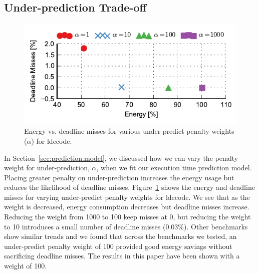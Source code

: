 \subsection{Under-prediction Trade-off}

\begin{figure}
  \begin{center}
    \includegraphics{exec_time_prediction/data/underpredict_sweep.pdf}
    \caption{Energy vs. deadline misses for various under-predict penalty
    weights ($\alpha$) for ldecode.}
    \label{fig:evaluation.underpredict_sweep}
  \end{center}
\end{figure}

In Section~\ref{sec:prediction.model}, we discussed how we can vary the
penalty weight for under-prediction, $\alpha$, when we fit our execution time
prediction model. Placing greater penalty on under-prediction increases the
energy usage but reduces the likelihood of deadline misses.
Figure~\ref{fig:evaluation.underpredict_sweep} shows the energy and deadline
misses for varying under-predict penalty weights for ldecode. We see that as
the weight is decreased, energy consumption decreases but
deadline misses increase. Reducing the weight from 1000 to 100 keep misses
at 0, but reducing the weight to 10 introduces a small number of deadline
misses (0.03\%). Other benchmarks show similar trends and
we found that across the benchmarks we tested, an under-predict penalty weight
of 100 provided good energy savings without sacrificing deadline misses. The
results in this paper have been shown with a weight of 100.

